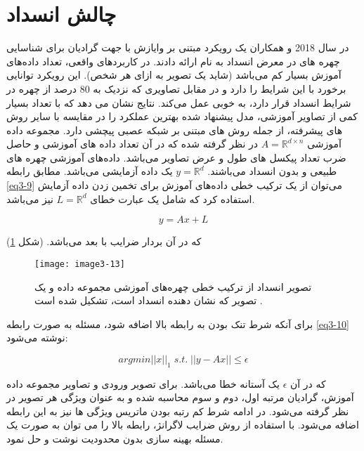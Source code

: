 \section{چالش انسداد}
در سال 2018  و همکاران \cite{WU2018256} یک رویکرد مبتنی بر وايازش  با جهت گرادیان برای شناسایی چهره های در معرض انسداد  به نام   ارائه دادند. در کاربردهای واقعی، تعداد داده‌های آموزش بسیار کم می‌باشد (شاید یک تصویر به ازای هر شخص). این رویکرد توانایی برخورد با این شرایط را دارد و در مقابل تصاویری که نزدیک به 80 درصد از چهره در شرایط انسداد قرار دارد، به خوبی عمل می‌کند. نتایج نشان می دهد که با تعداد بسیار کمی از تصاویر آموزشی، مدل پیشنهاد شده  بهترین عملکرد را در مقایسه با سایر روش های پیشرفته، از جمله روش های مبتنی بر شبکه عصبی پیچشی دارد. مجموعه داده آموزشی $A=\mathbb{R}^{d\times n}$ در نظر گرفته شده که در آن  تعداد داده های آموزشی و  حاصل ضرب تعداد پیکسل های طول و عرض تصاویر می‌باشد. داده‌های آموزشی چهره های طبیعی و بدون انسداد می‌باشند. $y=\mathbb{R}^d$ یک داده آزمایشی می‌باشد. مطابق رابطه \ref{eq3-9} می‌توان از یک ترکیب خطی داده‌های آموزش برای تخمین زدن داده آزمایش استفاده کرد که شامل یک عبارت خطای $L=\mathbb{R}^d$ نیز می‌باشد.
 
\begin{equation}
\label{eq3-9}
y=Ax+L
\end{equation}

\noindent‏
که در آن  بردار ضرایب با  بعد می‌باشد. (شکل \ref{image3-13})

\begin{figure}[h]
\centering
  \texttt{[image: image3-13]}
  \caption{تصویر انسداد از ترکیب خطی چهره‌های آموزشی مجموعه داده و یک تصویر  که نشان دهنده انسداد است، تشکیل شده است \cite{WU2018256}.}
  \label{image3-13}
\end{figure}

\noindent
برای آنکه شرط تنک بودن به رابطه بالا اضافه شود، مسئله به صورت رابطه \ref{eq3-10} نوشته می‌شود:

\begin{equation}
\label{eq3-10}
arg min ||x||_1 \;  s.t. \; ||y - Ax|| \leq \epsilon 	
\end{equation}

\noindent‏
که در آن $\epsilon$ یک آستانه خطا می‌باشد. برای تصویر ورودی و تصاویر مجموعه داده آموزش، گرادیان مرتبه اول، دوم و سوم محاسبه شده و به عنوان ویژگی هر تصویر در نظر گرفته می‌شود. در ادامه شرط کم رتبه بودن ماتریس ویژگی ها نیز به این رابطه اضافه می‌شود. با استفاده از روش ضرایب لاگرانژ، رابطه بالا را می توان به صورت یک مسئله بهینه سازی بدون محدودیت نوشت و حل نمود.

